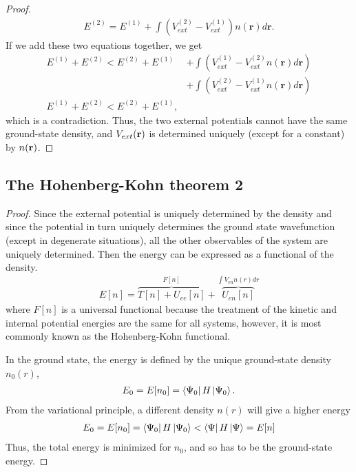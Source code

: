 \begin{proof}
\begin{align}
  E^{(2)} = E^{(1)} + \int \left(V_{ext}^{(2)} - V_{ext}^{(1)}\right) n(\textbf{r})d\textbf{r}.
\end{align}
If we add these two equations together, we get
\begin{align}
  E^{(1)} + E^{(2)} < E^{(2)} + E^{(1)} &+ \int \left( V_{ext}^{(1)} - V_{ext}^{(2)}n(\textbf{r})d\textbf{r} \right) \nonumber \\  &+ \int \left( V_{ext}^{(2)} - V_{ext}^{(1)}n(\textbf{r})d\textbf{r} \right) \nonumber \\
  E^{(1)} + E^{(2)} < E^{(2)} + E^{(1)},
\end{align}
which is a contradiction. Thus, the two external potentials cannot have the same ground-state density, and $V_{ext}(\textbf{\textbf{r}})$ is determined uniquely (except for a constant) by $n(\textbf{\textbf{r}})$.
\end{proof}

\subsection{The Hohenberg-Kohn theorem 2}
\label{appendix:theorem2}

\begin{proof}
  Since the external potential is uniquely determined by the density and since the potential in turn uniquely determines the ground state wavefunction (except in degenerate situations), all the other observables of the system are uniquely determined. Then the energy can be expressed as a functional of the density.
  \begin{align}
    E[n] = \overbrace{T[n] + U_{ee}[n]}^{F[n]} + \overbrace{U_{en}[n]}^{\int V_{en}n(r)dr}
  \end{align}
  where $F[n]$ is a universal functional because the treatment of the kinetic and internal potential energies are the same for all systems, however, it is most commonly known as the Hohenberg-Kohn functional.

  In the ground state, the energy is defined by the unique ground-state density $n_0(r)$,
  \begin{align}
    E_0 = E[n_0] = \bra{\Psi_0}H\ket{\Psi_0}.
  \end{align}
  From the variational principle, a different density $n(r)$ will give a higher energy
  \begin{align}
    E_0 = E[n_0] = \bra{\Psi_0}H\ket{\Psi_0} < \bra{\Psi}H\ket{\Psi} = E[n]
  \end{align}
  Thus, the total energy is minimized for $n_0$, and so has to be the ground-state energy.
\end{proof}

